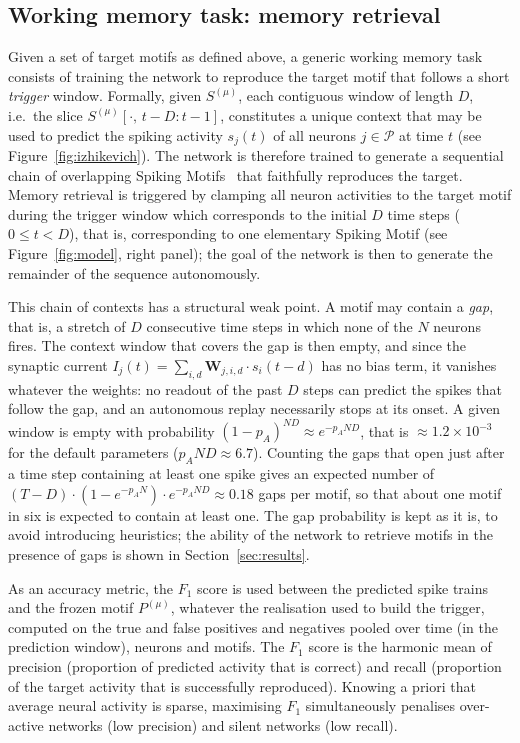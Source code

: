 \documentclass{scrartcl}
\newcommand{\citep}[1]{\parencite{#1}}
\begin{document}
\subsection{Working memory task: memory retrieval}
\label{sec:task}
%
Given a set of target motifs as defined above, a generic working memory task consists of training the network to reproduce the target motif that follows a short \emph{trigger} window. Formally, given $S^{(\mu)}$, each contiguous window of length $D$, i.e.\ the slice $S^{(\mu)}[\cdot,\, t{-}D:t{-}1]$, constitutes a unique context that may be used to predict the spiking activity $s_j(t)$ of all neurons $j \in \mathcal{P}$ at time $t$ (see Figure~\ref{fig:izhikevich}). The network is therefore trained to generate a sequential chain of overlapping Spiking Motifs~\citep{Perrinet2023,Kronland-Martinet2026} that faithfully reproduces the target. Memory retrieval is triggered by clamping all neuron activities to the target motif during the trigger window which corresponds to the initial $D$ time steps ($0 \le t < D$), that is, corresponding to one elementary Spiking Motif (see Figure~\ref{fig:model}, right panel); the goal of the network is then to generate the remainder of the sequence autonomously.

This chain of contexts has a structural weak point. A motif may contain a \emph{gap}, that is, a stretch of $D$ consecutive time steps in which none of the $N$ neurons fires. The context window that covers the gap is then empty, and since the synaptic current $I_j(t) = \sum_{i,d} \mathbf{W}_{j,i,d} \cdot s_i(t-d)$ has no bias term, it vanishes whatever the weights: no readout of the past $D$ steps can predict the spikes that follow the gap, and an autonomous replay necessarily stops at its onset. A given window is empty with probability $(1-p_A)^{N D} \approx e^{-p_A N D}$, that is $\approx 1.2 \times 10^{-3}$ for the default parameters ($p_A N D \approx 6.7$). Counting the gaps that open just after a time step containing at least one spike gives an expected number of $(T-D) \cdot (1 - e^{-p_A N}) \cdot e^{-p_A N D} \approx 0.18$ gaps per motif, so that about one motif in six is expected to contain at least one. The gap probability is kept as it is, to avoid introducing heuristics; the ability of the network to retrieve motifs in the presence of gaps is shown in Section~\ref{sec:results}.

As an accuracy metric, the $F_1$ score is used between the predicted spike trains and the frozen motif $P^{(\mu)}$, whatever the realisation used to build the trigger, computed on the true and false positives and negatives pooled over time (in the prediction window), neurons and motifs. The $F_1$ score is the harmonic mean of precision (proportion of predicted activity that is correct) and recall (proportion of the target activity that is successfully reproduced). Knowing a priori that average neural activity is sparse, maximising $F_1$ simultaneously penalises over-active networks (low precision) and silent networks (low recall).
\end{document}
